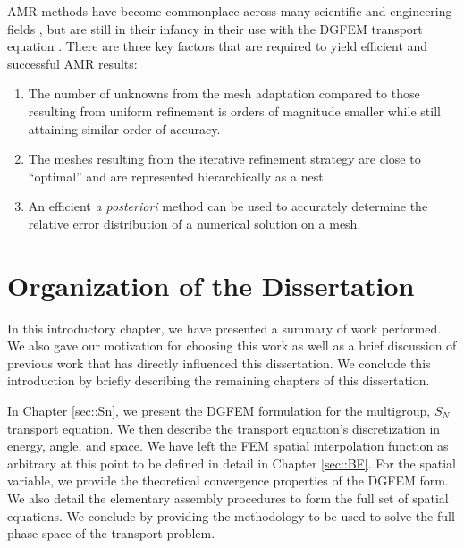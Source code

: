 AMR methods have become commonplace across many scientific and engineering fields \cite{plewa2005adaptive,carey1997computational,ramm2003error,karniadakis2013spectral,schwab1998p,solin2003higher}, but are still in their infancy in their use with the DGFEM transport equation \cite{fuhrer1997posteriori,hartmann2002adaptive,dedner2002adaptive,hartmann2003adaptive,ragusa2010two,wang2011standard}. There are three key factors that are required to yield efficient and successful AMR results:

\begin{enumerate}
\item The number of unknowns from the mesh adaptation compared to those resulting from uniform refinement is orders of magnitude smaller while still attaining similar order of accuracy.
\item The meshes resulting from the iterative refinement strategy are close to ``optimal'' and are represented hierarchically as a nest.
\item An efficient {\em a posteriori} method can be used to accurately determine the relative error distribution of a numerical solution on a mesh.
\end{enumerate}


\section{Organization of the Dissertation}
\label{sec::Intro_Organization}

In this introductory chapter, we have presented a summary of work performed. We also gave our motivation for choosing this work as well as a brief discussion of previous work that has directly influenced this dissertation. We conclude this introduction by briefly describing the remaining chapters of this dissertation.

In Chapter \ref{sec::Sn}, we present the DGFEM formulation for the multigroup, $S_N$ transport equation. We then describe the transport equation's discretization in energy, angle, and space. We have left the FEM spatial interpolation function as arbitrary at this point to be defined in detail in Chapter \ref{sec::BF}. For the spatial variable, we provide the theoretical convergence properties of the DGFEM form. We also detail the elementary assembly procedures to form the full set of spatial equations. We conclude by providing the methodology to be used to solve the full phase-space of the transport problem.

